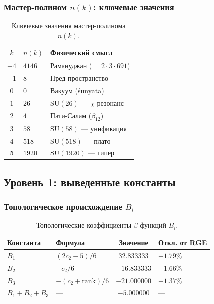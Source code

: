 \documentclass[11pt,a4paper]{article}
\newcommand{\SU}{\ensuremath{\mathrm{SU}}}
\theoremstyle{definition}
\begin{document}
\subsubsection{Мастер-полином \texorpdfstring{$n(k)$}{n(k)}: ключевые значения}

\begin{table}[ht]
\centering
\caption{Ключевые значения мастер-полинома \texorpdfstring{$n(k)$}{n(k)}.}
\label{tab:app-master-poly}
\begin{tabular}{cll}
\toprule
$k$ & $n(k)$ & Физический смысл \\
\midrule
$-4$ & $4146$ & Рамануджан ($= 2 \cdot 3 \cdot 691$) \\
$-1$ & $8$ & Пред-пространство \\
$0$  & $0$ & Вакуум (śūnyatā) \\
$1$  & $26$ & $\SU(26)$ — $\chi$-резонанс \\
$2$  & $4$ & Пати-Салам ($\beta_{12}$) \\
$3$  & $58$ & $\SU(58)$ — унификация \\
$4$  & $518$ & $\SU(518)$ — плато \\
$5$  & $1920$ & $\SU(1920)$ — гипер \\
\bottomrule
\end{tabular}
\end{table}

\subsection{Уровень 1: выведенные константы}
\label{app:level-1}

\subsubsection{Топологическое происхождение \texorpdfstring{$B_i$}{B\_i}}

\begin{table}[ht]
\centering
\caption{Топологические коэффициенты \texorpdfstring{$\beta$}{}-функций \texorpdfstring{$B_i$}{B\_i}.}
\label{tab:app-bi}
\begin{tabular}{llcl}
\toprule
Константа & Формула & Значение & Откл. от RGE \\
\midrule
$B_1$ & $(2c_2 - 5)/6$ & $32.833333$ & $+1.79\%$ \\
$B_2$ & $-c_2/6$ & $-16.833333$ & $+1.66\%$ \\
$B_3$ & $-(c_2 + \text{rank})/6$ & $-21.000000$ & $+1.37\%$ \\
$B_1 + B_2 + B_3$ & — & $-5.000000$ & — \\
\bottomrule
\end{tabular}
\end{table}
\end{document}
